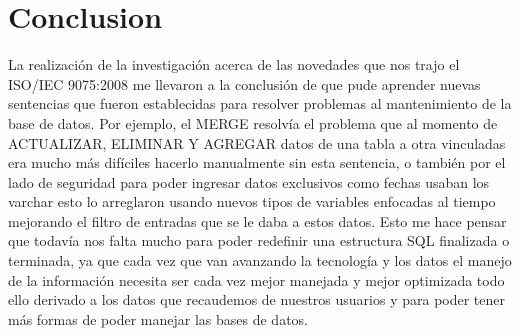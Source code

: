 \documentclass[preprint,12pt]{elsarticle}
\begin{document}
\section{Conclusion}
La realización de la investigación acerca de las novedades que nos trajo el ISO/IEC 9075:2008 me llevaron a la conclusión de que pude aprender nuevas sentencias que fueron establecidas para resolver problemas al mantenimiento de la base de datos. Por ejemplo, el MERGE resolvía el problema que al momento de ACTUALIZAR, ELIMINAR Y AGREGAR datos de una tabla a otra vinculadas era mucho más difíciles hacerlo manualmente sin esta sentencia, o también por el lado de seguridad para poder ingresar datos exclusivos como fechas usaban los varchar esto lo arreglaron usando nuevos tipos de variables enfocadas al tiempo mejorando el filtro de entradas que se le daba a estos datos. Esto me hace pensar que todavía nos falta mucho para poder redefinir una estructura SQL finalizada o terminada, ya que cada vez que van avanzando la tecnología y los datos el manejo de la información necesita ser cada vez mejor manejada y mejor optimizada todo ello derivado a los datos que recaudemos de nuestros usuarios y para poder tener más formas de poder manejar las bases de datos. 



	
	

	
	\newpage
	
		 
\citep{ISO1}  
\citep{ISO2}  
\citep{ISO3}  
\citep{ISO4}  
\citep{ISO5}  
	
	
	
	
	
	
	
	
	
	
	
	
	
\end{document}
